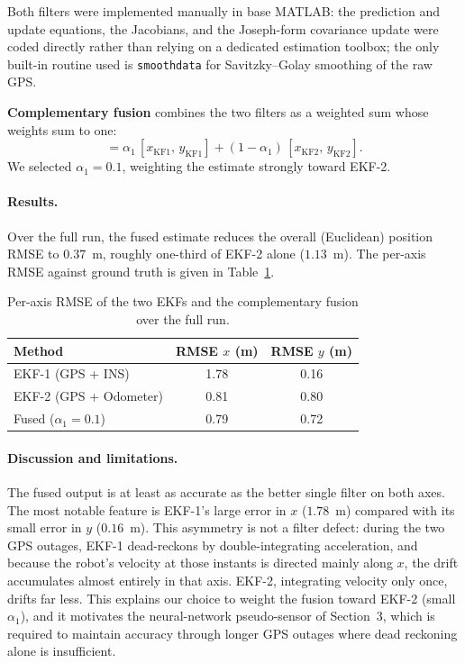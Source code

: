 \documentclass[11pt,a4paper]{article}
\begin{document}
Both filters were implemented manually in base MATLAB: the prediction and update
equations, the Jacobians, and the Joseph-form covariance update were coded directly
rather than relying on a dedicated estimation toolbox; the only built-in routine used
is \texttt{smoothdata} for Savitzky--Golay smoothing of the raw GPS.

\textbf{Complementary fusion} combines the two filters as a weighted sum whose
weights sum to one:
\begin{equation}
[x_{\text{fused}},\,y_{\text{fused}}]
= \alpha_1 \, [x_{\text{KF1}},\,y_{\text{KF1}}]
+ (1-\alpha_1)\,[x_{\text{KF2}},\,y_{\text{KF2}}].
\end{equation}
We selected $\alpha_1 = 0.1$, weighting the estimate strongly toward EKF-2.

\paragraph{Results.}
Over the full run, the fused estimate reduces the overall (Euclidean) position RMSE
to $0.37$~m, roughly one-third of EKF-2 alone ($1.13$~m). The per-axis RMSE against
ground truth is given in Table~\ref{tab:kalman}.

\begin{table}[H]
\centering
\begin{tabular}{lcc}
\toprule
\textbf{Method} & \textbf{RMSE $x$ (m)} & \textbf{RMSE $y$ (m)}\\
\midrule
EKF-1 (GPS + INS)        & 1.78 & 0.16\\
EKF-2 (GPS + Odometer)   & 0.81 & 0.80\\
Fused ($\alpha_1 = 0.1$) & 0.79 & 0.72\\
\bottomrule
\end{tabular}
\caption{Per-axis RMSE of the two EKFs and the complementary fusion over the full run.}
\label{tab:kalman}
\end{table}

\paragraph{Discussion and limitations.}
The fused output is at least as accurate as the better single filter on both axes.
The most notable feature is EKF-1's large error in $x$ ($1.78$~m) compared with its
small error in $y$ ($0.16$~m). This asymmetry is not a filter defect: during the two
GPS outages, EKF-1 dead-reckons by double-integrating acceleration, and because the
robot's velocity at those instants is directed mainly along $x$, the drift
accumulates almost entirely in that axis. EKF-2, integrating velocity only once,
drifts far less. This explains our choice to weight the fusion toward EKF-2 (small
$\alpha_1$), and it motivates the neural-network pseudo-sensor of Section~3, which is
required to maintain accuracy through longer GPS outages where dead reckoning alone
is insufficient.
\end{document}

